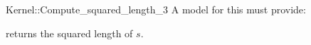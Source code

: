 \begin{ccRefFunctionObjectConcept}{Kernel::Compute_squared_length_3}
A model for this must provide:


       {returns the squared length of $s$. }

\end{ccRefFunctionObjectConcept}
